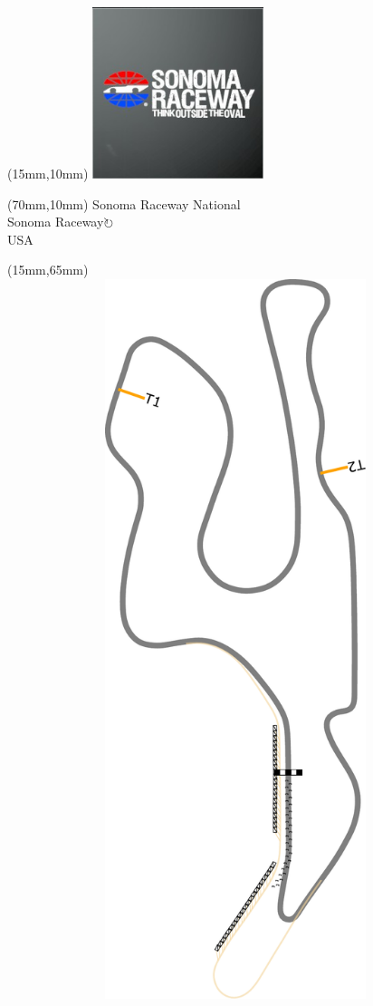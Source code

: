 \null\newpage
\begin{textblock*}{50mm}(15mm,10mm)%
\includegraphics[width=50mm]{LG/2015-05-20_00096.png}
\end{textblock*}
\begin{textblock*}{130mm}(70mm,10mm)%
{\fontsize{20}{20}\selectfont Sonoma Raceway National\\}
{\fontsize{16}{16}\selectfont Sonoma Raceway\hfill \Large$\circlearrowright$\\}
{\fontsize{12}{12}\selectfont USA\\}
\end{textblock*}
\begin{textblock*}{185mm}(15mm,65mm)%
\centering
\mbox{\includegraphics[width=185mm,height=210mm,keepaspectratio]{PT/SORANA.pdf}}
\end{textblock*}
